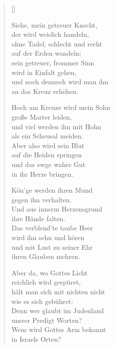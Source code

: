 \begin{multicols}{2}
\settowidth{\versewidth}{Siehe, mein getreuer Knecht,}
\begin{verse}[\versewidth]

 Siehe, mein getreuer Knecht,\\
der wird weislich handeln,\\
ohne Tadel, schlecht und recht\\
auf der Erden wandeln;\\
sein getreuer, frommer Sinn\\
wird in Einfalt gehen,\\
und noch dennoch wird man ihn\\
an das Kreuz erhöhen.

 Hoch am Kreuze wird mein Sohn\\
große Marter leiden,\\
und viel werden ihn mit Hohn\\
als ein Scheusal meiden.\\
Aber also wird sein Blut\\
auf die Heiden springen\\
und das ewge wahre Gut\\
in ihr Herze bringen.

 Kön'ge werden ihren Mund\\
gegen ihn verhalten.\\
Und aus innerm Herzensgrund\\
ihre Hände falten.\\
Das verblend'te taube Heer\\
wird ihn sehn und hören\\
und mit Lust zu seiner Ehr\\
ihren Glauben mehren.

 Aber da, wo Gottes Licht\\
reichlich wird gespüret,\\
hält man sich mit nichten nicht\\
wie es sich gebühret:\\
Denn wer glaubt im Judenland\\
unsrer Predigt Worten?\\
Wem wird Gottes Arm bekannt\\
in Israels Orten?


\end{verse}
\end{multicols}
